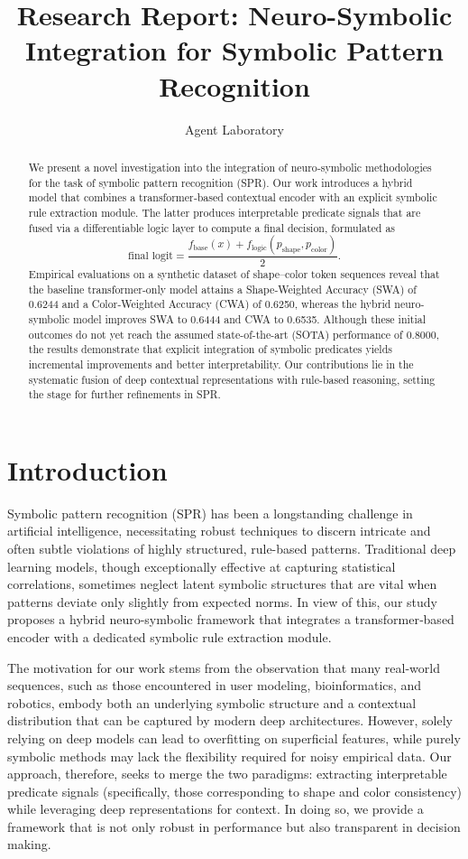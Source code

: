 \documentclass{article}
\title{Research Report: Neuro-Symbolic Integration for Symbolic Pattern Recognition}
\author{Agent Laboratory}
\date{}
\begin{document}
\maketitle

\begin{abstract}
We present a novel investigation into the integration of neuro‐symbolic methodologies for the task of symbolic pattern recognition (SPR). Our work introduces a hybrid model that combines a transformer‐based contextual encoder with an explicit symbolic rule extraction module. The latter produces interpretable predicate signals that are fused via a differentiable logic layer to compute a final decision, formulated as 
\[
\text{final logit} = \frac{f_{\text{base}}(x) + f_{\text{logic}}(p_{\text{shape}}, p_{\text{color}})}{2}.
\]
Empirical evaluations on a synthetic dataset of shape–color token sequences reveal that the baseline transformer‐only model attains a Shape‐Weighted Accuracy (SWA) of 0.6244 and a Color‐Weighted Accuracy (CWA) of 0.6250, whereas the hybrid neuro‐symbolic model improves SWA to 0.6444 and CWA to 0.6535. Although these initial outcomes do not yet reach the assumed state-of-the-art (SOTA) performance of 0.8000, the results demonstrate that explicit integration of symbolic predicates yields incremental improvements and better interpretability. Our contributions lie in the systematic fusion of deep contextual representations with rule-based reasoning, setting the stage for further refinements in SPR.
\end{abstract}

\section{Introduction}
Symbolic pattern recognition (SPR) has been a longstanding challenge in artificial intelligence, necessitating robust techniques to discern intricate and often subtle violations of highly structured, rule-based patterns. Traditional deep learning models, though exceptionally effective at capturing statistical correlations, sometimes neglect latent symbolic structures that are vital when patterns deviate only slightly from expected norms. In view of this, our study proposes a hybrid neuro-symbolic framework that integrates a transformer‐based encoder with a dedicated symbolic rule extraction module. 

The motivation for our work stems from the observation that many real-world sequences, such as those encountered in user modeling, bioinformatics, and robotics, embody both an underlying symbolic structure and a contextual distribution that can be captured by modern deep architectures. However, solely relying on deep models can lead to overfitting on superficial features, while purely symbolic methods may lack the flexibility required for noisy empirical data. Our approach, therefore, seeks to merge the two paradigms: extracting interpretable predicate signals (specifically, those corresponding to shape and color consistency) while leveraging deep representations for context. In doing so, we provide a framework that is not only robust in performance but also transparent in decision making.
\end{document}

